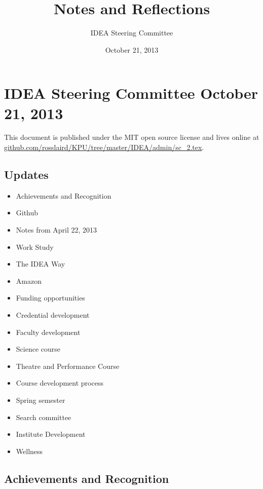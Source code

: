 \documentclass[letterpaper,10pt,headsepline]{scrreprt}
\author{IDEA Steering Committee}
\title{Notes and Reflections}
\date{October 21, 2013}
\begin{document}
\begin{titlingpage}
\begin{center}
\maketitle
\end{center}
\end{titlingpage}
\tableofcontents
\newpage
\chapter{IDEA Steering Committee October 21, 2013}

This document is published under the MIT open source license and lives online at \\ \url{github.com/rosslaird/KPU/tree/master/IDEA/admin/sc_2.tex}.

\section{Updates}

\begin{itemize}
\itemsep1pt\parskip0pt
\item
  Achievements and Recognition
\item
  Github
\item
  Notes from April 22, 2013
\item
  Work Study
\item
  The IDEA Way
\item
  Amazon
\item
  Funding opportunities
\item
  Credential development
\item
  Faculty development
\item
  Science course
\item
  Theatre and Performance Course
\item
  Course development process
\item
  Spring semester
\item
  Search committee
\item
  Institute Development
\item
  Wellness
\end{itemize}

\section{Achievements and Recognition}
\end{document}
